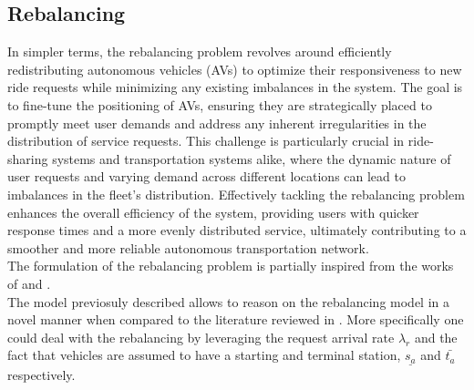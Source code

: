 \subsection{Rebalancing}\label{sec:rebal}
In simpler terms, the rebalancing problem revolves around efficiently redistributing autonomous vehicles (AVs) to optimize their responsiveness to new ride requests while minimizing any existing imbalances in the system. The goal is to fine-tune the positioning of AVs, ensuring they are strategically placed to promptly meet user demands and address any inherent irregularities in the distribution of service requests. This challenge is particularly crucial in ride-sharing  systems and transportation systems alike, where the dynamic nature of user requests and varying demand across different locations can lead to imbalances in the fleet's distribution. Effectively tackling the rebalancing problem enhances the overall efficiency of the system, providing users with quicker response times and a more evenly distributed service, ultimately contributing to a smoother and more reliable autonomous transportation network. \\
The formulation of the rebalancing problem is partially inspired from the works of  and .  \\
The model previosuly described allows to reason on the rebalancing model in a novel manner when compared to the literature reviewed in . More specifically one could deal with the rebalancing by leveraging the request arrival rate $\lambda_r$ and the fact that vehicles are assumed to have a starting and terminal station, $\underline{s_a}$ and $\bar{t_a}$ respectively. \\

